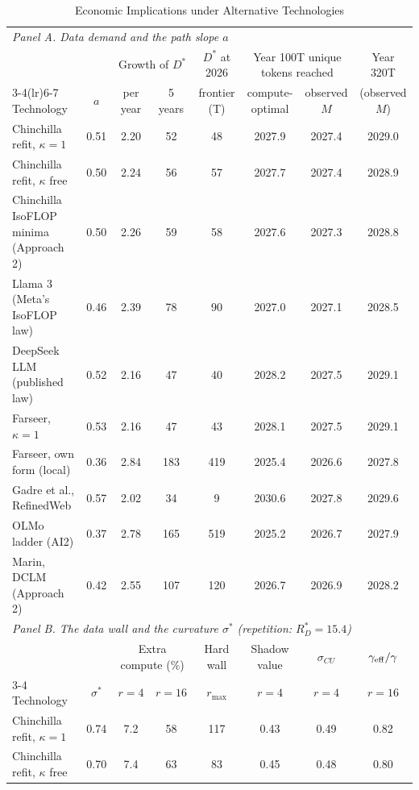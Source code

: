 \begin{table}[htbp]
\centering
\footnotesize
\caption{Economic Implications under Alternative Technologies}
\label{tab:ra3_econ}
\begin{tabular}{lccccccc}
\toprule
\multicolumn{8}{l}{\textit{Panel A. Data demand and the path slope $a$}} \\
 & & \multicolumn{2}{c}{Growth of $D^*$} & $D^*$ at 2026 & \multicolumn{2}{c}{Year 100T unique tokens reached} & Year 320T \\
\cmidrule(lr){3-4}\cmidrule(lr){6-7}
Technology & $a$ & per year & 5 years & frontier (T) & compute-optimal & observed $M$ & (observed $M$) \\
\midrule
Chinchilla refit, $\kappa=1$ & 0.51 & 2.20 & 52 & 48 & 2027.9 & 2027.4 & 2029.0 \\
Chinchilla refit, $\kappa$ free & 0.50 & 2.24 & 56 & 57 & 2027.7 & 2027.4 & 2028.9 \\
Chinchilla IsoFLOP minima (Approach 2) & 0.50 & 2.26 & 59 & 58 & 2027.6 & 2027.3 & 2028.8 \\
Llama 3 (Meta's IsoFLOP law) & 0.46 & 2.39 & 78 & 90 & 2027.0 & 2027.1 & 2028.5 \\
DeepSeek LLM (published law) & 0.52 & 2.16 & 47 & 40 & 2028.2 & 2027.5 & 2029.1 \\
Farseer, $\kappa=1$ & 0.53 & 2.16 & 47 & 43 & 2028.1 & 2027.5 & 2029.1 \\
Farseer, own form (local) & 0.36 & 2.84 & 183 & 419 & 2025.4 & 2026.6 & 2027.8 \\
Gadre et al., RefinedWeb & 0.57 & 2.02 & 34 & 9 & 2030.6 & 2027.8 & 2029.6 \\
OLMo ladder (AI2) & 0.37 & 2.78 & 165 & 519 & 2025.2 & 2026.7 & 2027.9 \\
Marin, DCLM (Approach 2) & 0.42 & 2.55 & 107 & 120 & 2026.7 & 2026.9 & 2028.2 \\
\midrule
\multicolumn{8}{l}{\textit{Panel B. The data wall and the curvature $\sigma^*$ (repetition: $R^*_D=15.4$)}} \\
 & & \multicolumn{2}{c}{Extra compute (\%)} & Hard wall & Shadow value & $\sigma_{CU}$ & $\gamma_{\rm eff}/\gamma$ \\
\cmidrule(lr){3-4}
Technology & $\sigma^*$ & $r=4$ & $r=16$ & $r_{\max}$ & $r=4$ & $r=4$ & $r=16$ \\
\midrule
Chinchilla refit, $\kappa=1$ & 0.74 & 7.2 & 58 & 117 & 0.43 & 0.49 & 0.82 \\
Chinchilla refit, $\kappa$ free & 0.70 & 7.4 & 63 & 83 & 0.45 & 0.48 & 0.80 \\

\end{tabular}
\end{table}
